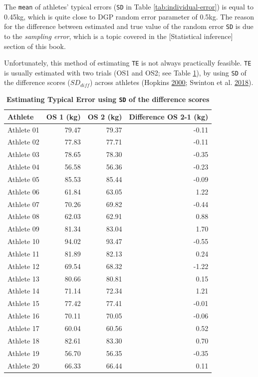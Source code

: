\documentclass[
]{book}
\begin{document}
The \texttt{mean} of athletes' typical errors (\texttt{SD} in Table \ref{tab:individual-error}) is equal to 0.45kg, which is quite close to DGP random error parameter of 0.5kg. The reason for the difference between estimated and true value of the random error \texttt{SD} is due to the \emph{sampling error}, which is a topic covered in the {[}Statistical inference{]} section of this book.

Unfortunately, this method of estimating \texttt{TE} is not always practically feasible. \texttt{TE} is usually estimated with two trials (OS1 and OS2; see Table \ref{tab:two-observations}), by using \texttt{SD} of the difference scores (\(SD_{diff}\)) across athletes (Hopkins \protect\hyperlink{ref-hopkinsMeasuresReliabilitySports2000}{2000}; Swinton et al. \protect\hyperlink{ref-swintonStatisticalFrameworkInterpret2018}{2018}).



\begin{table}

\caption{\label{tab:two-observations}\textbf{Estimating Typical Error using \texttt{SD} of the difference scores}}
\centering
\begin{tabular}[t]{lrrr}
\toprule
Athlete & OS 1 (kg) & OS 2 (kg) & Difference OS 2-1 (kg)\\
\midrule
Athlete 01 & 79.47 & 79.37 & -0.11\\
Athlete 02 & 77.83 & 77.71 & -0.11\\
Athlete 03 & 78.65 & 78.30 & -0.35\\
Athlete 04 & 56.58 & 56.36 & -0.23\\
Athlete 05 & 85.53 & 85.44 & -0.09\\
\addlinespace
Athlete 06 & 61.84 & 63.05 & 1.22\\
Athlete 07 & 70.26 & 69.82 & -0.44\\
Athlete 08 & 62.03 & 62.91 & 0.88\\
Athlete 09 & 81.34 & 83.04 & 1.70\\
Athlete 10 & 94.02 & 93.47 & -0.55\\
\addlinespace
Athlete 11 & 81.89 & 82.13 & 0.24\\
Athlete 12 & 69.54 & 68.32 & -1.22\\
Athlete 13 & 80.66 & 80.81 & 0.15\\
Athlete 14 & 71.14 & 72.34 & 1.21\\
Athlete 15 & 77.42 & 77.41 & -0.01\\
\addlinespace
Athlete 16 & 70.11 & 70.05 & -0.06\\
Athlete 17 & 60.04 & 60.56 & 0.52\\
Athlete 18 & 82.61 & 83.30 & 0.70\\
Athlete 19 & 56.70 & 56.35 & -0.35\\
Athlete 20 & 66.33 & 66.44 & 0.11\\
\bottomrule
\end{tabular}
\end{table}
\end{document}
